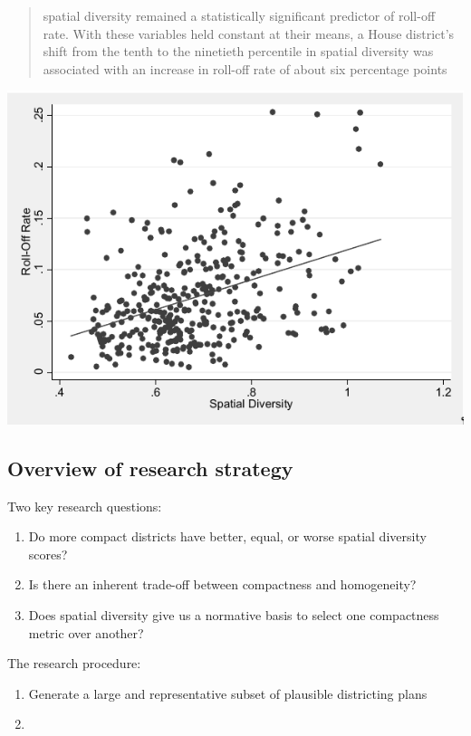 \documentclass[]{article}
\author{Zhenghong Lieu}
\date{}
\providecommand{\tightlist}{%
  \setlength{\itemsep}{0pt}\setlength{\parskip}{0pt}}
\begin{document}
\begin{quote}
spatial diversity remained a statistically significant predictor of
roll-off rate. With these variables held constant at their means, a
House district's shift from the tenth to the ninetieth percentile in
spatial diversity was associated with an increase in roll-off rate of
about six percentage points
\end{quote}

\includegraphics{img/sd_rolloff.png}

\cite{steph2012}

\hypertarget{overview-of-research-strategy}{%
\subsection{Overview of research
strategy}\label{overview-of-research-strategy}}

Two key research questions:

\begin{enumerate}
\def\labelenumi{\arabic{enumi}.}
\tightlist
\item
  Do more compact districts have better, equal, or worse spatial
  diversity scores?
\item
  Is there an inherent trade-off between compactness and homogeneity?
\item
  Does spatial diversity give us a normative basis to select one
  compactness metric over another?
\end{enumerate}

The research procedure:

\begin{enumerate}
\def\labelenumi{\arabic{enumi}.}
\item
  Generate a large and representative subset of plausible districting
  plans
\item
\end{enumerate}
\end{document}
